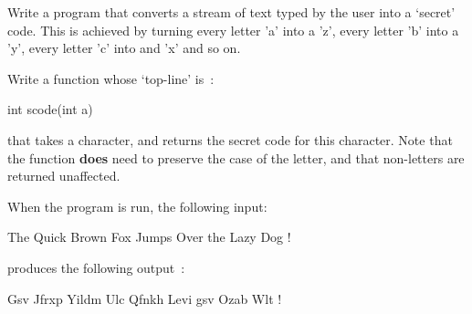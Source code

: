 
Write a program that converts a stream of text typed by the user
into a `secret' code.
This is achieved by turning every letter 'a' into a 'z', every letter 'b'
into a 'y', every letter 'c' into and 'x' and so on.

\begin{exercise}
Write a function whose `top-line' is~:

\begin{codesnippet}
int scode(int a)
\end{codesnippet}

that takes a character, and returns the secret code for this character.
Note that the function {\bf does} need to preserve the case of the letter,
and that non-letters are returned unaffected. 

When the program is run, the following input:
\begin{terminaloutput}
The Quick Brown Fox Jumps Over the Lazy Dog !
\end{terminaloutput}
produces the following output~:
\begin{terminaloutput}
Gsv Jfrxp Yildm Ulc Qfnkh Levi gsv Ozab Wlt !
\end{terminaloutput}
\end{exercise}
